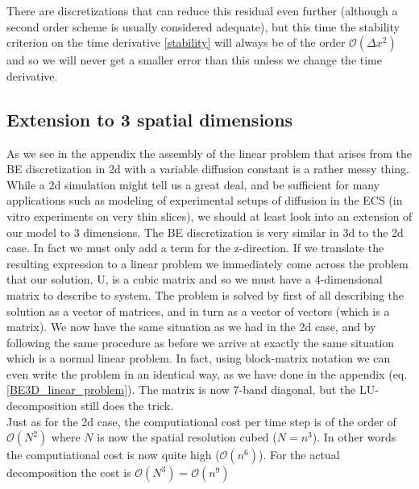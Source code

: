There are discretizations that can reduce this residual even further (although a second order scheme is usually considered adequate), but this time the stability criterion on the time derivative \ref{stability} will always be of the order $\mathcal{O}(\Delta x^2)$ and so we will never get a smaller error than this unless we change the time derivative.

\subsection{Extension to 3 spatial dimensions}

As we see in the appendix the assembly of the linear problem that arises from the BE discretization in 2d with a variable diffusion constant is a rather messy thing. 
While a 2d simulation might tell us a great deal, and be sufficient for many applications such as modeling of experimental setups of diffusion in the ECS (in vitro experiments on very thin slices), we should at least look into an extension of our model to 3 dimensions. 
The BE discretization is very similar in 3d to the 2d case. In fact we must only add a term for the z-direction. 
If we translate the resulting expression to a linear problem we immediately come across the problem that our solution, U, is a cubic matrix and so we must have a 4-dimensional matrix to describe to system. 
The problem is solved by first of all describing the solution as a vector of matrices, and in turn as a vector of vectors (which is a matrix). 
We now have the same situation as we had in the 2d case, and by following the same procedure as before we arrive at exactly the same situation which is a normal linear problem. 
In fact, using block-matrix notation we can even write the problem in an identical way, as we have done in the appendix (eq. \ref{BE3D_linear_problem}). 
The matrix is now 7-band diagonal, but the LU-decomposition still does the trick.\\
Just as for the 2d case, the computiational cost per time step is of the order of $\mathcal{O}(N^2)$ where $N$ is now the spatial resolution cubed ($N = n^3$). 
In other words the computiational cost is now quite high ($\mathcal{O}(n^6)$).
For the actual decomposition the cost is $\mathcal{O}(N^3) = \mathcal{O}(n^9)$

